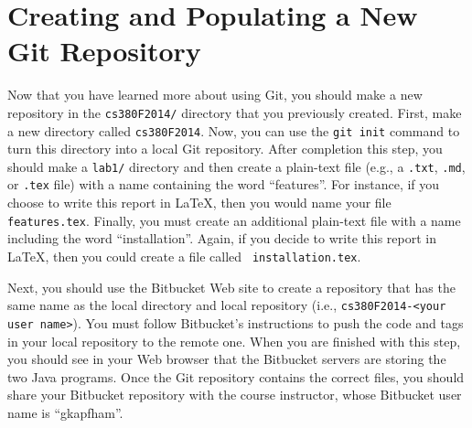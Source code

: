 \begin{enumerate}

\end{enumerate}

\section*{Creating and Populating a New Git Repository}

Now that you have learned more about using Git, you should make a new repository in the {\tt cs380F2014/} directory that
you previously created.  First, make a new directory called {\tt cs380F2014}. Now, you can use the
{\tt git init} command to turn this directory into a local Git repository.  After completion this step, you should
make a {\tt lab1/} directory and then create a plain-text file (e.g., a {\tt .txt}, {\tt .md}, or {\tt .tex} file) with
a name containing the word ``features''.  For instance, if you choose to write this report in \LaTeX, then you would
name your file {\tt features.tex}. Finally, you must create an additional plain-text file with a name including the word
``installation''.  Again, if you decide to write this report in \LaTeX, then you could create a file called {\tt
  installation.tex}. 

Next, you should use the Bitbucket Web site to create a repository that has the same name as the local directory and
local repository (i.e., {\tt cs380F2014-<your user name>}).  You must follow Bitbucket's instructions to push the code
and tags in your local repository to the remote one. When you are finished with this step, you should see in your Web
browser that the Bitbucket servers are storing the two Java programs. Once the Git repository contains the correct
files, you should share your Bitbucket repository with the course instructor, whose Bitbucket user name is ``gkapfham''.


